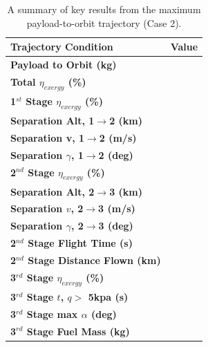 \begin{table}[ht]
	\centering
\begin{tabular}{l c } 
	\hline \textbf{Trajectory Condition}
	& Value
	\\
	\hline \textbf{Payload to Orbit (kg)}
	& \textbf{\PayloadToOrbitStandardNoReturn}
	\\
	\textbf{Total $\eta_{exergy}$ (\%)}
	& \textbf{\totalExergyEffStandardNoReturn}
	\\
	\hline 
	\textbf{1$^{st}$ Stage $\eta_{exergy}$ (\%)}
	& \textbf{\firstExergyEffStandardNoReturn}
	\\

	\textbf{Separation Alt, 1$\rightarrow$2 (km)}
	& \firstsecondSeparationAltStandardNoReturn
	\\
	\textbf{Separation v, 1$\rightarrow$2 (m/s)}
	& \firstsecondSeparationvStandardNoReturn
	\\
	\textbf{Separation $\gamma$, 1$\rightarrow$2 (deg)}
	& \firstsecondSeparationgammaStandardNoReturn
	\\
	\hline 
	\textbf{2$^{nd}$ Stage $\eta_{exergy}$ (\%)}
	& \textbf{\secondExergyEffStandardNoReturn}
	\\

	\textbf{Separation Alt, 2$\rightarrow$3 (km)}
	& \secondthirdSeparationAltStandardNoReturn
	\\
	\textbf{Separation $v$, 2$\rightarrow$3 (m/s)}
	& \secondthirdSeparationvStandardNoReturn
	\\
	\textbf{Separation $\gamma$, 2$\rightarrow$3 (deg)}
	& \secondthirdSeparationgammaStandardNoReturn
	\\
	\textbf{2$^{nd}$ Stage Flight Time (s)}
	& \secondFlightTimeStandardNoReturn
	\\
	\textbf{2$^{nd}$ Stage Distance Flown (km)}
	& \SecondDistStandardNoReturn
	\\
	\hline 
	\textbf{3$^{rd}$ Stage $\eta_{exergy}$ (\%)}
	& \textbf{\thirddExergyEffStandardNoReturn}
	\\

	\textbf{3$^{rd}$ Stage $t$, $q >$ 5kpa (s)}
	& \thirdqOverFiveStandardNoReturn
	\\
	\textbf{3$^{rd}$ Stage max $\alpha$ (deg)}
	& \thirdmaxAoAStandardNoReturn
	\\
	\textbf{3$^{rd}$ Stage Fuel Mass (kg)}
	& \thirdmFuelStandardNoReturn
	\\
	\hline 
\end{tabular} 
	\caption{A summary of key results from the maximum payload-to-orbit trajectory (Case 2).}
	\label{tab:summaryStandardNoReturn}
\end{table}







